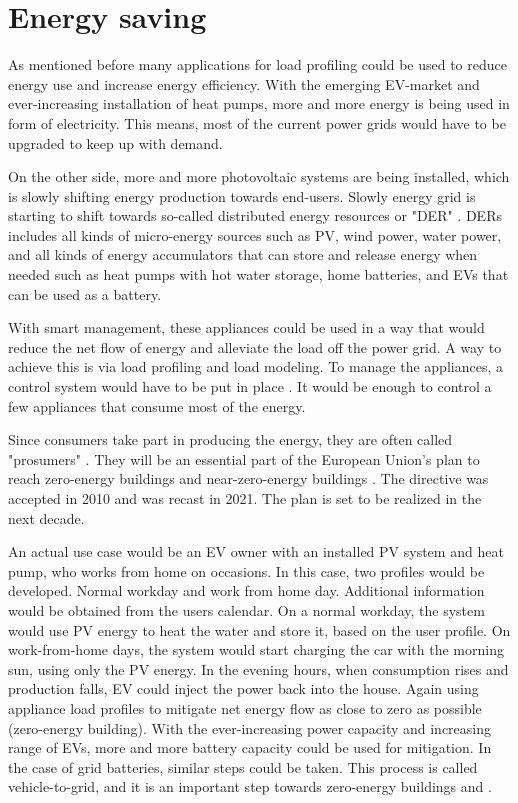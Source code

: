 \documentclass[
11pt, %
english, %
singlespacing, %
headsepline, %
]{MastersDoctoralThesis} %
\begin{document}
\section{Energy saving}

As mentioned before many applications for load profiling could be used to reduce energy use and increase energy efficiency. 
With the emerging EV-market and ever-increasing installation of heat pumps, more and more energy is being used in form of electricity. 
This means, most of the current power grids would have to be upgraded to keep up with demand.

On the other side, more and more photovoltaic systems are being installed,
which is slowly shifting energy production towards end-users.
Slowly energy grid is starting to shift towards so-called distributed energy resources or "DER" \cite{MORENOJARAMILLO2021445}.
DERs includes all kinds of micro-energy sources such as PV, wind power, water power, and all kinds of energy accumulators that can store 
and release energy when needed such as heat pumps with hot water storage, home batteries, and EVs that can be used as a battery.

With smart management, these appliances could be used in a way that would reduce the net flow of energy and alleviate the load off the power grid.
A way to achieve this is via load profiling and load modeling. 
To manage the appliances, a control system would have to be put in place \cite{DirectLoadControll2021}.
It would be enough to control a few appliances that consume most of the energy. 

Since consumers take part in producing the energy, they are often called "prosumers" \cite{Prosumer2016}.
They will be an essential part of the European Union's plan to reach zero-energy buildings
and near-zero-energy buildings \cite{eu2021}. The directive was accepted in 2010 and was recast in 2021.
The plan is set to be realized in the next decade.


An actual use case would be an EV owner with an installed PV system and heat pump, who works from home on occasions.
In this case, two profiles would be developed. Normal workday and work from home day.
Additional information would be obtained from the users calendar. 
On a normal workday, the system would use PV energy to heat the water and store it, based on the user profile.
On work-from-home days, the system would start charging the car with the morning sun, using only the PV energy. 
In the evening hours, when consumption rises and production falls, EV could inject the power back into the house. 
Again using appliance load profiles to mitigate net energy flow as close to zero as possible (zero-energy building).
With the ever-increasing power capacity and increasing range of EVs, more and more battery capacity could be used for mitigation. 
In the case of grid batteries, similar steps could be taken.
This process is called vehicle-to-grid, and it is an important step towards zero-energy buildings \cite{EV2018} and \cite{EV2020}.
\end{document}
